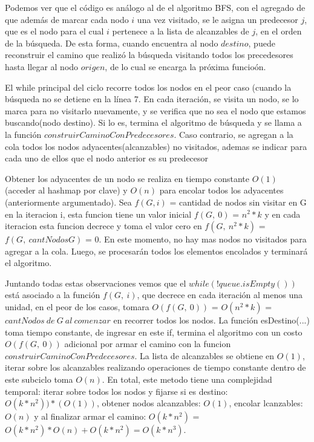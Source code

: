 	Podemos ver que el c\'odigo es an\'alogo al de el algoritmo BFS, con el agregado de que adem\'as de marcar cada nodo $i$ una vez visitado, se le asigna un predecesor $j$, que es el nodo para el cual $i$ pertenece a la lista de alcanzables de $j$, en el orden de la b\'usqueda. De esta forma, cuando encuentra al nodo $destino$, puede reconstruir el camino que realiz\'o la b\'usqueda visitando todos los precedesores hasta llegar al nodo $origen$, de lo cual se encarga la pr\'oxima funcio\'on.

\vspace{2mm}

	El while principal del ciclo recorre todos los nodos en el peor caso (cuando la b\'usqueda no se detiene en la l\'inea 7. En cada iteraci\'on, se visita un nodo, se lo marca para no visitarlo nuevamente, y se verifica que no sea el nodo que estamos buscando(nodo destino).
	Si lo es, termina el algoritmo de b\'usqueda y se llama a la funci\'on $construirCaminoConPredecesores$. Caso contrario, se agregan a la cola todos los nodos adyacentes(alcanzables) no visitados, ademas se indicar para cada uno de ellos que el nodo anterior es su predecesor

	\vspace{2mm}

	Obtener los adyacentes de un nodo se realiza en tiempo constante $O(1)$ (acceder al hashmap por clave) y $O(n)$ para encolar todos los adyacentes (anteriormente argumentado). Sea $f(G, i)$ = {cantidad de nodos sin visitar en G en la iteracion i}, esta funcion tiene un valor inicial $f(G,\: 0)$ = $n^2*k$ y en cada iteracion esta funcion decrece y toma el valor cero en $f(G, \:n^2*k)$ = $f(G,\: cantNodosG)$ = $0$. En este momento, no hay mas nodos no visitados para agregar a la cola. Luego, se procesar\'an todos los elementos encolados y terminar\'a el algoritmo.
	\vspace{2mm}


	 Juntando todas estas observaciones vemos que el $while(!queue.isEmpty())$ est\'a asociado a la funci\'on $f(G,\: i)$, que decrece en cada iteraci\'on al menos una unidad, en el peor de los casos, tomara $O(f(G,\:0))$ = $O(n^2*k)$ = $cantNodos \:de\: G \:al\: comenzar$ en recorrer todos los nodos. La funci\'on esDestino(...) toma tiempo constante, de ingresar en este if, termina el algoritmo con un costo $O(f(G,\: 0))$ adicional por armar	el camino con la funcion $construirCaminoConPredecesores$. La lista de alcanzables se obtiene en $O(1)$, iterar sobre los alcanzables realizando operaciones de tiempo constante dentro de este subciclo toma $O(n)$. En total, este metodo tiene una complejidad temporal: iterar sobre todos los nodos y fijarse si es destino: $O(k*n^2))*(O(1))$, obtener nodos alcanzables: $O(1)$, encolar lcanzables: $O(n)$ y al finalizar armar el camino: $O(k*n^2)$	= $O(k*n^2)*O(n) + O(k*n^2) = O(k*n^3) $.

